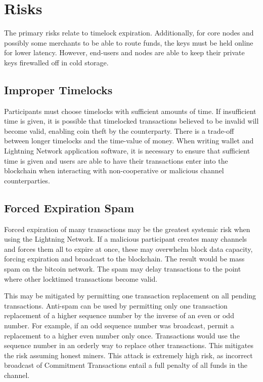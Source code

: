 \documentclass[letterpaper,11pt]{article}
\begin{document}
\section{Risks}

The primary risks relate to timelock expiration. Additionally, for core nodes
and possibly some merchants to be able to route funds, the keys must be held
online for lower latency. However, end-users and nodes are able to keep their 
private keys firewalled off in cold storage.

\subsection{Improper Timelocks}

Participants must choose timelocks with sufficient amounts of time. If
insufficient time is given, it is possible that timelocked transactions believed
to be invalid will become valid, enabling coin theft by the counterparty. There
is a trade-off between longer timelocks and the time-value of money. When
writing wallet and Lightning Network application software, it is necessary to
ensure that sufficient time is given and users are able to have their
transactions enter into the blockchain when interacting with non-cooperative or
malicious channel counterparties.

\subsection{Forced Expiration Spam}

Forced expiration of many transactions may be the greatest systemic risk when
using the Lightning Network. If a malicious participant creates many channels
and forces them all to expire at once, these may overwhelm block data capacity,
forcing expiration and broadcast to the blockchain. The result would be mass
spam on the bitcoin network. The spam may delay transactions to the point where
other locktimed transactions become valid.

This may be mitigated by permitting one transaction replacement on all pending
transactions. Anti-spam can be used by permitting only one transaction
replacement of a higher sequence number by the inverse of an even or odd number.
For example, if an odd sequence number was broadcast, permit a replacement to
a higher even number only once. Transactions would use the sequence number in an
orderly way to replace other transactions. This mitigates the risk assuming
honest miners. This attack is extremely high risk, as incorrect broadcast of
Commitment Transactions entail a full penalty of all funds in the channel.
\end{document}
